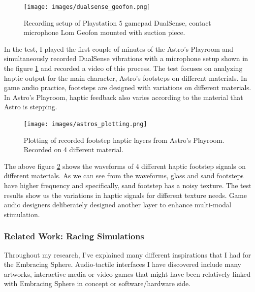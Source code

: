                 \begin{figure}[H]
                    \centering
                    \texttt{[image: images/dualsense\_geofon.png]}
                    \caption{Recording setup of Playstation 5 gamepad DualSense, contact microphone Lom Geofon mounted with suction piece.}
                    \label{fig:DUALSENSE_GEOFON}
                \end{figure}

                In the test, I played the first couple of minutes of the Astro's Playroom and simultaneously recorded DualSense vibrations with a microphone setup shown in the figure \ref{fig:DUALSENSE_GEOFON} and recorded a video of this process. The test focuses on analyzing haptic output for the main character, Astro's footsteps on different materials. In game audio practice, footsteps are designed with variations on different materials\cite{Princibles_of_Game_Audio_and_Sound_Design}. In Astro's Playroom, haptic feedback also varies according to the material that Astro is stepping.\par

                \begin{figure}[H]
                    \centering
                    \texttt{[image: images/astros\_plotting.png]}
                    \caption{Plotting of recorded footstep haptic layers from Astro's Playroom. Recorded on 4 different material.}
                    \label{fig:ASTROS_FS}
                \end{figure}

                The above figure \ref{fig:ASTROS_FS} shows the waveforms of 4 different haptic footstep signals on different materials. As we can see from the waveforms, glass and sand footsteps have higher frequency and specifically, sand footstep has a noisy texture. The test results show us the variations in haptic signals for different texture needs. Game audio designers deliberately designed another layer to enhance multi-modal stimulation.\par
            \subsubsection{Related Work: Racing Simulations}
                Throughout my research, I've explained many different inspirations that I had for the Embracing Sphere. Audio-tactile interfaces I have discovered include many artworks, interactive media or video games that might have been relatively linked with Embracing Sphere in concept or software/hardware side.\par

